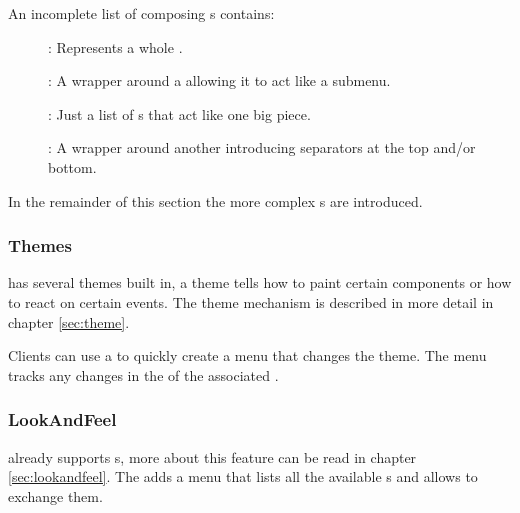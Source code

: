An incomplete list of composing s contains:
\begin{description}
 \item []: Represents a whole .
 \item []: A wrapper around a  allowing it to act like a submenu.
 \item []: Just a list of s that act like one big piece.
 \item []: A wrapper around another  introducing separators at the top and/or bottom.
\end{description}


In the remainder of this section the more complex s are introduced.

\subsubsection{Themes}
 has several themes built in, a theme tells how to paint certain components or how to react on certain events. The theme mechanism is described in more detail in chapter \ref{sec:theme}.

Clients can use a  to quickly create a menu that changes the theme. The menu tracks any changes in the  of the associated .


\subsubsection{LookAndFeel} \label{sec:menu:lookandfeel}
 already supports s, more about this feature can be read in chapter \ref{sec:lookandfeel}. The  adds a menu that lists all the available s and allows to exchange them.

